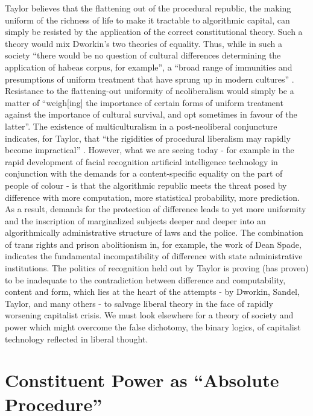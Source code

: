 \documentclass[12pt,oneside]{memoir}
\begin{document}
Taylor believes that the flattening out of the procedural republic, the making uniform of the richness of life to make it tractable to algorithmic capital, can simply be resisted by the application of the correct constitutional theory. Such a theory would mix Dworkin's two theories of equality. Thus, while in such a society ``there would be no question of cultural differences determining the application of habeas corpus, for example'', a ``broad range of immunities and presumptions of uniform treatment that have sprung up in modern cultures'' \citep[61]{Taylor1994}. Resistance to the flattening-out uniformity of neoliberalism would simply be a matter of ``weigh[ing] the importance of certain forms of uniform treatment against the importance of cultural survival, and opt sometimes in favour of the latter''. The existence of multiculturalism in a post-neoliberal conjuncture indicates, for Taylor, that ``the rigidities of procedural liberalism may rapidly become impractical'' \citep[61]{Taylor1994}. However, what we are seeing today - for example in the rapid development of facial recognition artificial intelligence technology in conjunction with the demands for a content-specific equality on the part of people of colour - is that the algorithmic republic meets the threat posed by difference with more computation, more statistical probability, more prediction. As a result, demands for the protection of difference leads to yet more uniformity and the inscription of marginalized subjects deeper and deeper into an algorithmically administrative structure of laws and the police. The combination of trans rights and prison abolitionism in, for example, the work of Dean Spade, indicates the fundamental incompatibility of difference with state administrative institutions. The politics of recognition held out by Taylor is proving (has proven) to be inadequate to the contradiction between difference and computability, content and form, which lies at the heart of the attempts - by Dworkin, Sandel, Taylor, and many others - to salvage liberal theory in the face of rapidly worsening capitalist crisis. We must look elsewhere for a theory of society and power which might overcome the false dichotomy, the binary logics, of capitalist technology reflected in liberal thought. 


\section*{Constituent Power as ``Absolute Procedure''}
\end{document}
